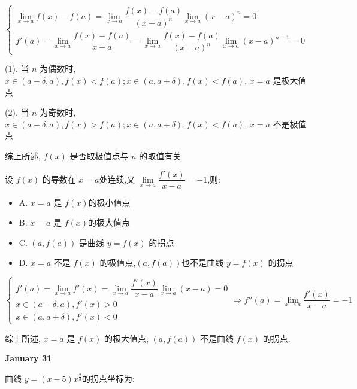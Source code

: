\begin{solution}

	$$\begin{cases}
		\lim\limits_{x\to a} f(x)-f(a) = \lim\limits_{x\to a}\dfrac{f(x)-f(a)}{(x-a)^{n}}\lim\limits_{x\to a}(x-a)^{n} = 0\\
		f'(a) = \lim\limits_{x\to a}\dfrac{f(x)-f(a)}{x-a} =\lim\limits_{x\to a}\dfrac{f(x)-f(a)}{(x-a)^{n}}\lim\limits_{x\to a}(x-a)^{n-1} =0
	\end{cases}$$

	(1). 当 $n$ 为偶数时, $x\in (a-\delta,a), f(x) < f(a); x\in (a,a+\delta), f(x) < f(a)$, $x=a$ 是极大值点

	(2). 当 $n$ 为奇数时, $x\in (a-\delta,a), f(x) > f(a); x\in (a,a+\delta), f(x) < f(a)$, $x=a$ 不是极值点

	综上所述, $f(x)$ 是否取极值点与 $n$ 的取值有关
\end{solution}

\begin{example}[][Exam: 27.4.18]
	设 $f(x)$ 的导数在 $x=a$处连续,又 $\lim\limits_{x\to a}\dfrac{f'(x)}{x-a}=-1$,则:
\begin{itemize}
	\item A. $x=a$ 是 $f(x)$的极小值点
	\item B. $x=a$ 是 $f(x)$的极大值点
	\item C. $(a,f(a))$ 是曲线 $y=f(x)$ 的拐点
	\item D. $x=a$ 不是 $f(x)$ 的极值点,$(a,f(a))$也不是曲线 $y=f(x)$ 的拐点
\end{itemize}
\end{example}

\begin{solution}

	$$\begin{cases}
		f'(a) = \lim\limits_{x\to a} f'(x) = \lim\limits_{x\to a}\dfrac{f'(x)}{x-a}\lim\limits_{x\to a}(x-a) = 0\\
		x\in (a-\delta,a), f'(x) > 0\\
		x\in (a,a+\delta), f'(x) < 0
	\end{cases}\Rightarrow f''(a) = \lim\limits_{x\to a}\dfrac{f'(x)}{x-a} = -1$$

	综上所述, $x = a$ 是 $f(x)$ 的极大值点, $(a,f(a))$ 不是曲线 $f(x)$ 的拐点.
\end{solution}

\textcolor{purplea}{\textbf{January 31}}

\begin{example}[][Exam: 27.4.19]
	曲线 $y=(x-5)x^{\frac{2}{3}}$的拐点坐标为:
\end{example}

